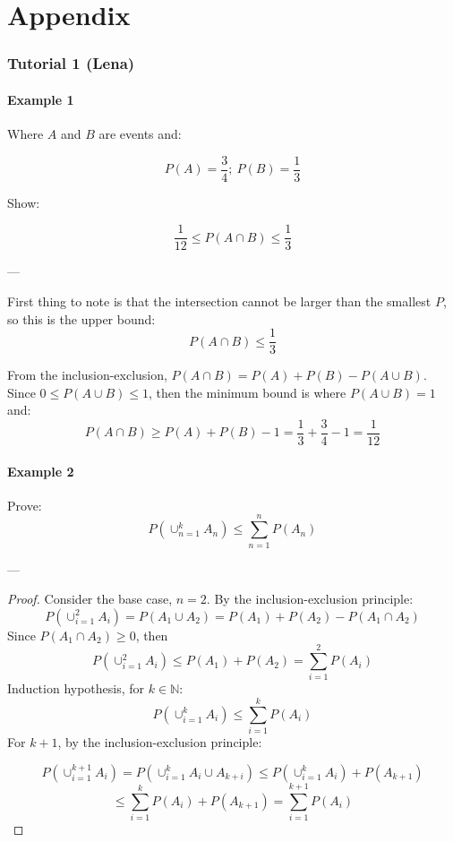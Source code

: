 \documentclass{report}
\renewcommand\appendix{\par
  \setcounter{section}{0}
  \setcounter{subsection}{0}
  \setcounter{figure}{0}
  \setcounter{table}{0}
  \renewcommand\thesection{Appendix \Alph{section}}
  \renewcommand\thefigure{\Alph{section}\arabic{figure}}
  \renewcommand\thetable{\Alph{section}\arabic{table}}
}
\begin{document}
\newpage

 
\pagebreak


\appendix
\onehalfspacing
\chapter*{Appendix}
\renewcommand{\thesubsection}{\Alph{subsection}}

\subsection{Tutorial 1 (Lena)}

\subsubsection*{Example 1}

Where $A$ and $B$ are events and:

$$P(A) = \frac{3}{4};\ P(B)=\frac{1}{3}$$

Show:

$$\frac{1}{12} \leq P(A \cap B) \leq \frac{1}{3}$$


---

First thing to note is that the intersection cannot be larger than the smallest $P$, so this is the upper bound: $$P(A \cap B) \leq \frac{1}{3}$$

From the inclusion-exclusion, $P(A \cap B) = P(A) + P(B) - P(A \cup B)$. Since $0 \leq P(A \cup B) \leq 1$, then the minimum bound is where $P(A \cup B) = 1$ and: $$P(A \cap B) \geq P(A) + P(B) - 1 = \frac{1}{3} + \frac{3}{4} - 1 = \frac{1}{12}$$


\subsubsection*{Example 2}

Prove: $$P(\cup_{n=1}^k A_n) \leq \sum_{n=1}^{n} P(A_n)$$

---

\begin{proof}[Proof]

Consider the base case, $n=2$. By the inclusion-exclusion principle:
$$P(\cup_{i=1}^2 A_i) = P(A_1 \cup A_2) = P(A_1) + P(A_2) - P(A_1 \cap A_2)$$
Since $P(A_1 \cap A_2) \geq 0$, then  $$P(\cup_{i=1}^2 A_i) \leq P(A_1) + P(A_2) 
 = \sum_{i=1}^{2} P(A_i)$$
Induction hypothesis, for $k \in \mathbb{N}$: $$P(\cup_{i=1}^k A_i) \leq \sum_{i=1}^{k} P(A_i)$$
For $k+1$, by the inclusion-exclusion principle:


$$P ( \cup_{i=1}^{k+1} A_i ) = P(\cup^k_{i=1} A_i \cup A_{k+i}) \leq P(\cup_{i=1}^k A_i) + P(A_{k+1})$$ $$ \leq \sum_{i=1}^k P(A_i) + P(A_{k+1}) = \sum_{i=1}^{k+1} P(A_i) $$
  
\end{proof}
\end{document}
